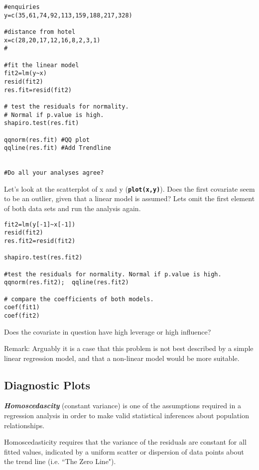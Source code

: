 \documentclass[ModuleBmain.tex]{subfiles}
\begin{document}
\begin{framed}
\begin{verbatim}
#enquiries
y=c(35,61,74,92,113,159,188,217,328)
 	
#distance from hotel
x=c(28,20,17,12,16,8,2,3,1)	
#

#fit the linear model	
fit2=lm(y~x)					
resid(fit2)
res.fit=resid(fit2)

# test the residuals for normality.
# Normal if p.value is high.
shapiro.test(res.fit)	
	
qqnorm(res.fit)	#QQ plot
qqline(res.fit)	#Add Trendline


#Do all your analyses agree?

\end{verbatim}
\end{framed}
Let’s look at the scatterplot of x and y (\textbf{\texttt{plot(x,y)}}).  Does the first covariate seem to be an outlier, given that a linear model is assumed?
Lets omit the first element of both data sets and run the analysis again.

\begin{framed}
\begin{verbatim}
fit2=lm(y[-1]~x[-1])
resid(fit2)
res.fit2=resid(fit2)

shapiro.test(res.fit2)			

#test the residuals for normality. Normal if p.value is high.
qqnorm(res.fit2);  qqline(res.fit2)			

# compare the coefficients of both models.
coef(fit1)
coef(fit2)

\end{verbatim}
\end{framed}
Does the covariate in question have high leverage or high influence?


Remark: Arguably it is a case that this problem is not best described by a simple linear regression model, and that a non-linear model would be more suitable.

\subsection{Diagnostic Plots}
\textbf{\emph{Homoscedascity }}(constant variance) is one of the assumptions required in a regression analysis in order to make valid statistical inferences about population relationships.

Homoscedasticity requires that the variance of the residuals are constant for all fitted values, indicated by a uniform scatter or dispersion of data points about the trend line (i.e. ``The Zero Line").
\end{document}

